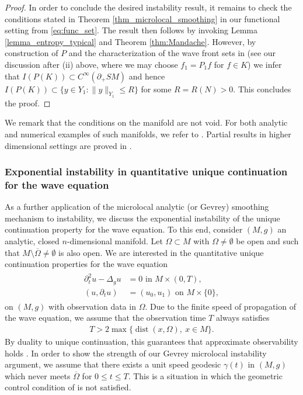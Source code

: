 \documentclass[12pt,twoside]{amsart}
\numberwithin{equation}{section}
\renewcommand{\leq}{\leqslant}
\newcommand {\p} {\partial}
\newcommand {\D} {\Delta}
\DeclareMathOperator {\dist} {dist}
\newcommand{\ol}[1]{\overline{#1}}
\begin{document}
\begin{proof}
In order to conclude the desired instability result, it remains to check the conditions stated in Theorem \ref{thm_microlocal_smoothing} in our functional setting from \eqref{eq:func_set}. The result then follows by invoking Lemma \ref{lemma_entropy_typical} and Theorem \ref{thm:Mandache}.
However, by construction of $P$ and the characterization of the wave front sets in \cite{MSU15} (see our discussion after (ii) above, where we may choose $f_1 = P_1 f$ for $f \in K$) we infer that $I(P(K)) \subset C^{\infty}(\p_+ SM)$ and hence  $I(P(K)) \subset \{y \in Y_1: \|y\|_{Y_1}\leq R\}$ for some $R=R(N)>0$. This concludes the proof.
\end{proof}


We remark that the conditions on the manifold are not void. For both analytic and numerical examples of such manifolds, we refer to \cite[Section 6]{MSU15}. Partial results in higher dimensional settings are proved in \cite{HU18}. 




\subsubsection{Exponential instability in quantitative unique continuation for the wave equation}

\label{sec:wave_ucp}

As a further application of the microlocal analytic (or Gevrey) smoothing mechanism to instability, we discuss the exponential instability of the unique continuation property for the wave equation. To this end, consider $(M,g)$ an analytic, closed $n$-dimensional manifold. Let $\Omega \subset M$ with $\Omega \neq \emptyset$ be open and such that $M \setminus \overline{\Omega} \neq \emptyset$ is also open. We are interested in the quantitative unique continuation properties for the wave equation
\begin{align}
\label{eq:wave}
\begin{split}
\p_t^2 u - \D_g u & = 0 \mbox{ in } M \times (0,T),\\
(u, \p_t u) &= (u_0, u_1) \mbox{ on } M \times \{0\},
\end{split}
\end{align}
on $(M,g)$ with observation data in $\Omega$. Due to the finite speed of propagation of the wave equation, we assume that the observation time $T$ always satisfies
\begin{align*}
T > 2 \max\{\dist(x,\Omega), \ x \in M\}.
\end{align*}
By duality to unique continuation, this guarantees that approximate observability holds \cite{Tataru_wave, LaurentLeautaud}.
In order to show the strength of our Gevrey microlocal instability argument, we assume that there exists a unit speed geodesic $\gamma(t)$ in $(M,g)$ which never meets $\ol{\Omega}$ for $0 \leq t \leq T$. This is a situation in which the geometric control condition of \cite{BardosLebeauRauch} is not satisfied. 
\end{document}
